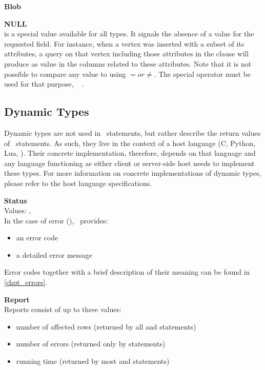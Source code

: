 \begin{minipage}{\textwidth}
\textbf{Blob} \\
\end{minipage}

\begin{minipage}{\textwidth}
\textbf{NULL} \\
 is a special value available for all types.
It signals the absence of a value for the requested field.
For instance, when a vertex was inserted with a subset
of its attributes, a query on that vertex including
those attributes in the  clause
will produce  as value in the
columns related to these attributes.
Note that it is not possible to compare any value to 
using $= or \neq$. The special operator  must
be used for that purpose, \eg\
  .
\end{minipage}

\subsection{Dynamic Types}
Dynamic types are not used in \sql\ statements,
but rather describe the return values of \sql\
statements. As such, they live in the context
of a host language (C, Python, Lua, \etc).
Their concrete implementation, therefore,
depends on that language and any language
functioning as either client or server-side host
needs to implement these types.
For more information on concrete implementations
of dynamic types, please refer to the
host language \acronym{api} specifications.

\begin{minipage}{\textwidth}
\textbf{Status}\\
Values: , \\
In the case of error (), \nowdb\ provides:
\begin{itemize}
\item an error code
\item a detailed error message
\end{itemize}
Error codes together with a brief description
of their meaning can be found in \ref{chpt_errors}.
\end{minipage}

\begin{minipage}{\textwidth}
\textbf{Report}\\
Reports consist of up to three values:
\begin{itemize}
\item number of affected rows
(returned by all  and  statements)
\item number of errors
(returned only by \acronym{dll} statements)
\item running time
(returned by most  and  statements)
\end{itemize}
\end{minipage}


